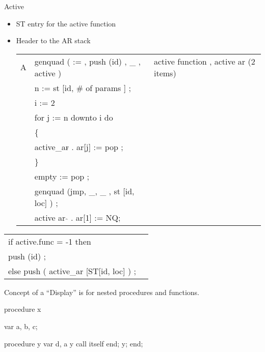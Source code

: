 \documentclass[11pt]{article}
\begin{document}
Active 
\begin{itemize}
\item ST entry for the active function 
\item Header to the AR stack 
\begin{table}[htdp]
\begin{center}
\begin{tabular}{ll|l}
A & genquad ( := , push (id) , \_ , active )  & active function , active ar (2 items)\\
	&	n := st [id, \# of params ] ;	\\
	&	i := 2	\\
	&	for j := n downto i do \\
	& \{ \\
	& \hspace{05.cm} active\_ar$\hat{ } $ . ar[j] := pop ; \\
	& \} \\
	& empty := pop ; \\
	& genquad (jmp, \_, \_ , st [id, loc] ) ; \\
	& active ar $\hat{ } $ . ar[1] := NQ;  \\

\end{tabular}
\end{center}
\label{default}
\end{table}%

\end{itemize}


\begin{table}[htdp]
\begin{center}
\begin{tabular}{|ll}
if active.func = -1 then  \\
\hspace {0.5cm} push (id) ;  \\
else
\hspace {0.5cm} push ( active\_ar [ST[id, loc] ) ; \\
\end{tabular}
\end{center}
\label{default}
\end{table}%

Concept of a ``Display'' is for nested procedures and functions.   


procedure x

	var a, b, c;
	
	procedure y
		var d, a
			y call itself
	end;
	y;
end;
\end{document}

